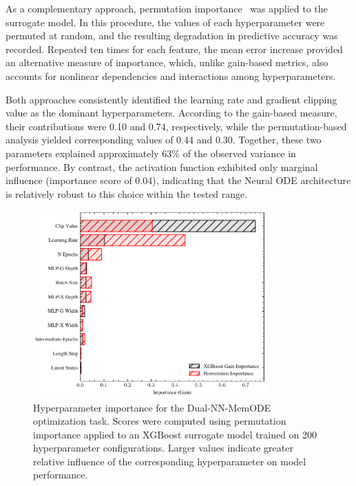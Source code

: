 \documentclass[11pt, oneside]{article}
\begin{document}
As a complementary approach, permutation importance~\cite{Altmann2010} was applied to the surrogate model. In this procedure, the values of each hyperparameter were permuted at random, and the resulting degradation in predictive accuracy was recorded. Repeated ten times for each feature, the mean error increase provided an alternative measure of importance, which, unlike gain-based metrics, also accounts for nonlinear dependencies and interactions among hyperparameters.

Both approaches consistently identified the learning rate and gradient clipping value as the dominant hyperparameters. According to the gain-based measure, their contributions were 0.10 and 0.74, respectively, while the permutation-based analysis yielded corresponding values of 0.44 and 0.30. Together, these two parameters explained approximately 63\% of the observed variance in performance. By contrast, the activation function exhibited only marginal influence (importance score of 0.04), indicating that the Neural ODE architecture is relatively robust to this choice within the tested range.

\begin{figure}[H]
    \centering
    \includegraphics[width=0.8\textwidth]{mms_figs/xgboost_permutation_importance.pdf}
    \caption{Hyperparameter importance for the Dual-NN-MemODE optimization task. Scores were computed using permutation importance applied to an XGBoost surrogate model trained on 200 hyperparameter configurations. Larger values indicate greater relative influence of the corresponding hyperparameter on model performance.}
    \label{fig:hyperparameter_importance}
\end{figure}


\end{document}
